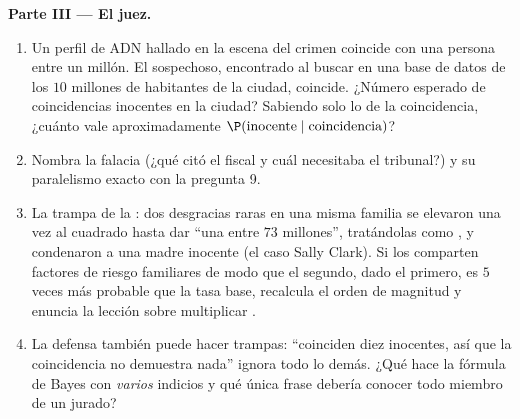 \begin{problem}
\medskip
\noindent\textbf{Parte III --- El juez.}
\begin{enumerate}[resume]
  \item Un perfil de ADN hallado en la escena del crimen coincide con una
        persona entre un millón. El sospechoso, encontrado al buscar en una
        base de datos de los $10$ millones de habitantes de la ciudad,
        coincide. ¿Número esperado de coincidencias inocentes en la ciudad?
        Sabiendo solo lo de la coincidencia, ¿cuánto vale aproximadamente
        $\P(\text{inocente} \mid \text{coincidencia})$?
  \item Nombra la falacia (¿qué  citó el fiscal y cuál
        necesitaba el tribunal?) y su paralelismo exacto con la pregunta 9.
  \item La trampa de la : dos desgracias raras en una misma
        familia se elevaron una vez al cuadrado hasta dar ``una entre $73$
        millones'', tratándolas como , y condenaron a una
        madre inocente (el caso Sally Clark). Si los  comparten
        factores de riesgo familiares de modo que el segundo, dado el
        primero, es $5$ veces más probable que la tasa base, recalcula el
        orden de magnitud y enuncia la lección sobre multiplicar
        .
  \item La defensa también puede hacer trampas: ``coinciden diez inocentes,
        así que la coincidencia no demuestra nada'' ignora todo lo demás.
        ¿Qué hace la fórmula de Bayes con \emph{varios} indicios y qué
        única frase debería conocer todo miembro de un jurado?
\end{enumerate}


\end{problem}
